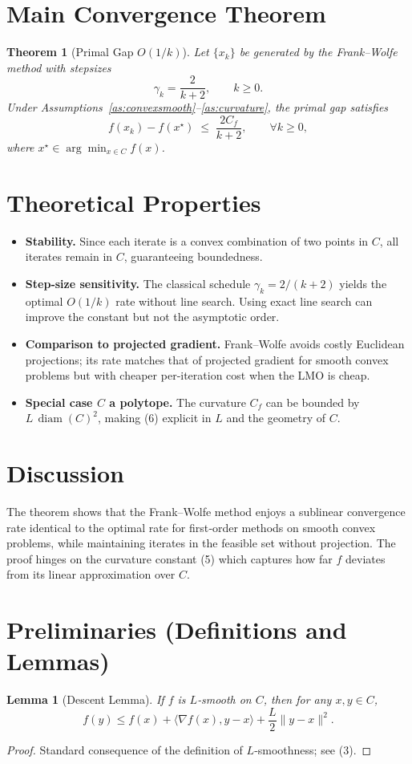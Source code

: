 \documentclass{article}
\newtheorem{theorem}{Theorem}
\newtheorem{lemma}{Lemma}
\newcommand{\diam}{\operatorname{diam}}
\begin{document}
\section*{Main Convergence Theorem}
\begin{theorem}[Primal Gap $O(1/k)$]\label{thm:fw-rate}
Let $\{x_{k}\}$ be generated by the Frank–Wolfe method with stepsizes
\[
\gamma_{k}= \frac{2}{k+2},\qquad k\ge0.
\]
Under Assumptions~\ref{as:convexsmooth}–\ref{as:curvature}, the primal gap satisfies
\[
f(x_{k})-f(x^{\star})\;\le\;\frac{2C_{f}}{k+2},\qquad\forall k\ge0,
\tag{6}
\]
where $x^{\star}\in\arg\min_{x\in C}f(x)$.
\end{theorem}

\section*{Theoretical Properties}
\begin{itemize}
\item \textbf{Stability.} Since each iterate is a convex combination of two points in $C$, all iterates remain in $C$, guaranteeing boundedness.
\item \textbf{Step‑size sensitivity.} The classical schedule $\gamma_{k}=2/(k+2)$ yields the optimal $O(1/k)$ rate without line search. Using exact line search can improve the constant but not the asymptotic order.
\item \textbf{Comparison to projected gradient.} Frank–Wolfe avoids costly Euclidean projections; its rate matches that of projected gradient for smooth convex problems but with cheaper per‑iteration cost when the LMO is cheap.
\item \textbf{Special case $C$ a polytope.} The curvature $C_{f}$ can be bounded by $L\,\diam(C)^{2}$, making (6) explicit in $L$ and the geometry of $C$.
\end{itemize}

\section*{Discussion}
The theorem shows that the Frank–Wolfe method enjoys a sublinear convergence rate identical to the optimal rate for first‑order methods on smooth convex problems, while maintaining iterates in the feasible set without projection. The proof hinges on the curvature constant (5) which captures how far $f$ deviates from its linear approximation over $C$.

\newpage
\section*{Preliminaries (Definitions and Lemmas)}
\begin{lemma}[Descent Lemma]\label{lem:descent}
If $f$ is $L$‑smooth on $C$, then for any $x,y\in C$,
\[
f(y)\le f(x)+\langle\nabla f(x),y-x\rangle+\frac{L}{2}\|y-x\|^{2}.
\tag{7}
\]
\end{lemma}
\begin{proof}
Standard consequence of the definition of $L$‑smoothness; see (3). \qedhere
\end{proof}
\end{document}
